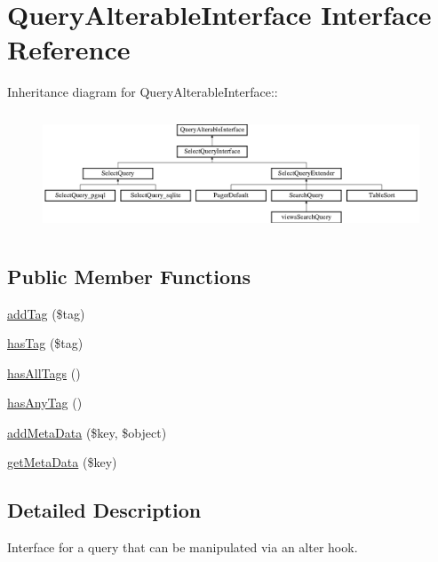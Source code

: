 \hypertarget{interfaceQueryAlterableInterface}{
\section{QueryAlterableInterface Interface Reference}
\label{interfaceQueryAlterableInterface}
}
Inheritance diagram for QueryAlterableInterface::\begin{figure}[H]
\begin{center}
\leavevmode
\includegraphics[height=3.56688cm]{interfaceQueryAlterableInterface}
\end{center}
\end{figure}
\subsection*{Public Member Functions}
\begin{DoxyCompactItemize}
\item 
\hyperlink{interfaceQueryAlterableInterface_a86b5a64d7b1b34959666e9d5eada3940}{addTag} (\$tag)
\item 
\hyperlink{interfaceQueryAlterableInterface_a1273bb283ebfe44b6c839d97b18056a9}{hasTag} (\$tag)
\item 
\hyperlink{interfaceQueryAlterableInterface_a752e1b07ff69e4807fcaeab1aa172c57}{hasAllTags} ()
\item 
\hyperlink{interfaceQueryAlterableInterface_ae52ceaffc7ad7cf7f2b0542e8d55b3f1}{hasAnyTag} ()
\item 
\hyperlink{interfaceQueryAlterableInterface_a4551fab9d5d25eeed040fdac7c8be4ae}{addMetaData} (\$key, \$object)
\item 
\hyperlink{interfaceQueryAlterableInterface_aad1aabcc6d07374eafaf1b47f911121a}{getMetaData} (\$key)
\end{DoxyCompactItemize}


\subsection{Detailed Description}
Interface for a query that can be manipulated via an alter hook. 

